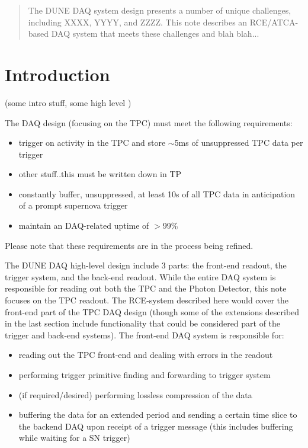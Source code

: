 \begin{abstract}
The DUNE DAQ system design presents a number of unique challenges, including XXXX, YYYY, and ZZZZ.   This note describes an RCE/ATCA-based DAQ system that meets these challenges and blah blah...


\end{abstract}

\section{Introduction}
\label{sec:introduction}
(some intro stuff, some high level )

The DAQ design (focusing on the TPC) must meet the following requirements:
\begin{itemize}
\item{trigger on activity in the TPC and store $\sim$5ms of unsuppressed TPC data per trigger}
\item{other stuff..this must be written down in TP}
\item{constantly buffer, unsuppressed, at least 10s of all TPC data in anticipation of a prompt supernova trigger}
\item{maintain an DAQ-related uptime of $>$99\%}
\end{itemize}
Please note that these requirements are in the process being refined.  

The DUNE DAQ high-level design include 3 parts:  the front-end readout, the trigger system, and the back-end readout.  While the entire DAQ system is responsible for reading out both the TPC and the Photon Detector, this note focuses on the TPC readout.  The RCE-system described here would cover the front-end part of the TPC DAQ design (though some of the extensions described in the last section include functionality that could be considered part of the trigger and back-end systems).   The front-end DAQ system is responsible for:

\begin{itemize}
\item  reading out the TPC front-end and dealing with errors in the readout
\item  performing trigger primitive finding and forwarding to trigger system
\item (if required/desired) performing lossless compression of the data
\item buffering the data for an extended period and sending a certain time slice to the backend DAQ upon receipt of a trigger message (this includes buffering while waiting for a SN trigger)
\end{itemize}

